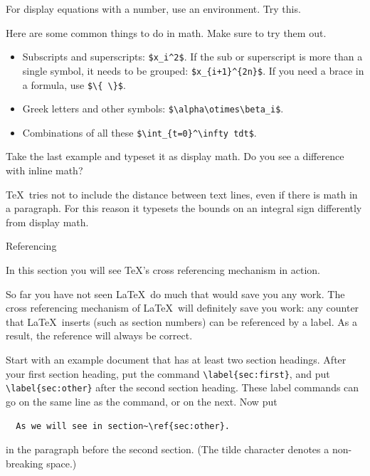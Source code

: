 For display
equations with a number, use an  environment. Try this.

Here are some common things to do in math. Make sure to try them out.
\begin{itemize}
\item Subscripts and superscripts: \verb-$x_i^2$-. If the sub or superscript
  is more than a single symbol, it needs to be grouped:
  \verb-$x_{i+1}^{2n}$-. If you need a brace in a formula, use
  \verb-$\{ \}$-.
\item Greek letters and other symbols: \verb-$\alpha\otimes\beta_i$-.
\item Combinations of all these \verb-$\int_{t=0}^\infty tdt$-.
\end{itemize}

\begin{exercise}
Take the last example and typeset it as display math. Do
you see a difference with inline math?
\end{exercise}
\begin{outcome}
{\TeX\ tries not to include the distance between text lines, even if
there is math in a paragraph. For this reason it typesets the bounds
on an integral sign differently from display math.}
\end{outcome}

 {Referencing}

\begin{purpose}
  In this section you will see \TeX's cross referencing mechanism in action.
\end{purpose}

So far you have not seen \LaTeX\ do much that would save you any
work. The cross referencing mechanism of \LaTeX\ will definitely save
you work: any counter that \LaTeX\ inserts (such as section numbers)
can be referenced by a label. As a result, the reference will always
be correct.

Start with an example
document that has at least two section headings. After your first section
heading, put the command \verb+\label{sec:first}+,
and put \verb+\label{sec:other}+ after the second section
heading. These label commands can go on the same line as the
 command, or on the next.
Now put 
\begin{verbatim}
  As we will see in section~\ref{sec:other}.
\end{verbatim}
in the paragraph before the second section. (The tilde character
denotes a non-breaking space.) 

